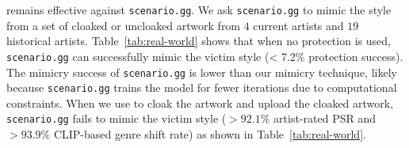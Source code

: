 \system{} remains effective against \texttt{scenario.gg}. We ask
\texttt{scenario.gg} to mimic the style from a set of cloaked or uncloaked
artwork from $4$ current artists and $19$ historical
artists. Table~\ref{tab:real-world} shows that when no protection is used,
\texttt{scenario.gg} can successfully mimic the victim style (< 7.2\%
protection success). The mimicry success of \texttt{scenario.gg} is lower
than our mimicry technique, likely because \texttt{scenario.gg} trains the
model for fewer iterations due to computational constraints. When we use
\system{} to cloak the artwork and upload the cloaked artwork,
\texttt{scenario.gg} fails to mimic the victim style ($> 92.1\%$ artist-rated
PSR and $> 93.9\%$ CLIP-based genre shift rate) as shown in Table~\ref{tab:real-world}.
